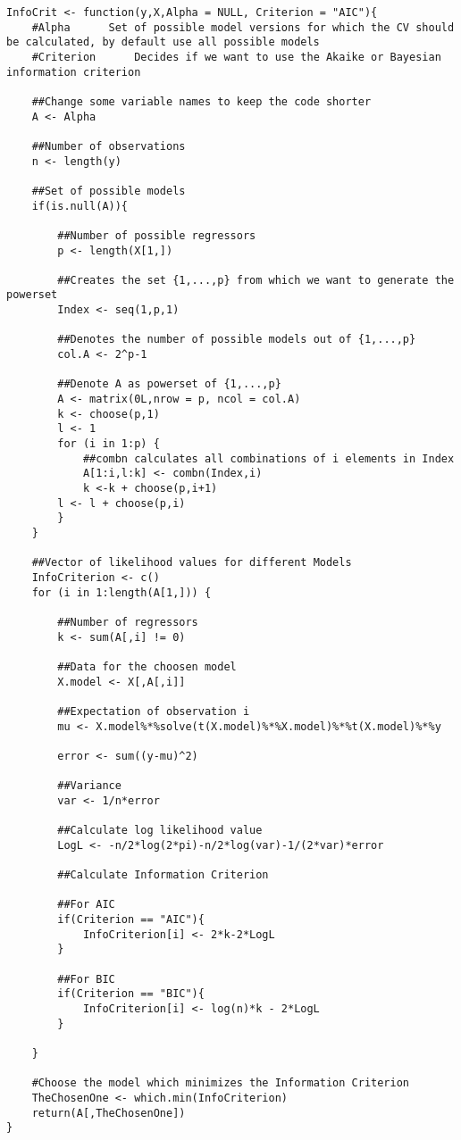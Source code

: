 \documentclass[Research_Module_ES.tex]{subfiles}
\begin{document}
\begin{lstlisting}[title={Akaike and Schwarz Information Criterion}]
InfoCrit <- function(y,X,Alpha = NULL, Criterion = "AIC"){
	#Alpha		Set of possible model versions for which the CV should 		be calculated, by default use all possible models
	#Criterion    	Decides if we want to use the Akaike or Bayesian 	     information criterion

	##Change some variable names to keep the code shorter
	A <- Alpha

	##Number of observations
	n <- length(y)

	##Set of possible models
	if(is.null(A)){

		##Number of possible regressors
		p <- length(X[1,])

		##Creates the set {1,...,p} from which we want to generate the powerset
		Index <- seq(1,p,1)    

		##Denotes the number of possible models out of {1,...,p} 
		col.A <- 2^p-1     

		##Denote A as powerset of {1,...,p}
		A <- matrix(0L,nrow = p, ncol = col.A)      
		k <- choose(p,1)
		l <- 1
		for (i in 1:p) {
			##combn calculates all combinations of i elements in Index
			A[1:i,l:k] <- combn(Index,i)               
			k <-k + choose(p,i+1)
		l <- l + choose(p,i)
		}
	}

	##Vector of likelihood values for different Models
	InfoCriterion <- c()
	for (i in 1:length(A[1,])) {

		##Number of regressors
		k <- sum(A[,i] != 0)

		##Data for the choosen model
		X.model <- X[,A[,i]] 

		##Expectation of observation i
		mu <- X.model%*%solve(t(X.model)%*%X.model)%*%t(X.model)%*%y

		error <- sum((y-mu)^2)

		##Variance
		var <- 1/n*error

		##Calculate log likelihood value
		LogL <- -n/2*log(2*pi)-n/2*log(var)-1/(2*var)*error

		##Calculate Information Criterion

		##For AIC
		if(Criterion == "AIC"){
			InfoCriterion[i] <- 2*k-2*LogL
		}

		##For BIC
		if(Criterion == "BIC"){
			InfoCriterion[i] <- log(n)*k - 2*LogL
		}

	}

	#Choose the model which minimizes the Information Criterion
	TheChosenOne <- which.min(InfoCriterion)
	return(A[,TheChosenOne])
}
\end{lstlisting}
\end{document}
